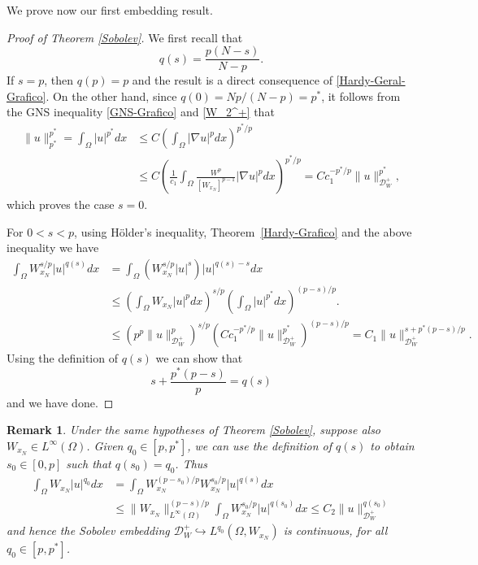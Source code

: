 \documentclass[12pt]{amsart}
\newtheorem{remark}[theorem]{Remark}
\theoremstyle{definition}
\theoremstyle{plain}
\newcommand{\dint}{\int_{\Omega}}
\begin{document}
We prove now our first embedding result.
\begin{proof}[Proof of Theorem \ref{Sobolev}]
We first recall that
$$q(s)=\frac{p(N-s)}{N-p}.
$$
If $s=p$, then $q(p)=p$ and the result is a direct consequence of \eqref{Hardy-Geral-Grafico}. On the other hand, since $q(0)=Np/(N-p)=p^*$,  
it follows from the GNS inequality \eqref{GNS-Grafico} and \eqref{W_2^+} that
 \begin{align*}
     \|u\|_{p^*}^{p^*} = \dint  |u|^{p^*}dx
			& \leq C\left(\dint  |\nabla u|^pdx\right)^{{p^*}/{p}} \\
            & \leq C \left( \frac{1}{c_1} \dint \frac{W^p}{[W_{x_N}]^{p-1}} 
            |\nabla u|^p dx \right)^{p^*/p} = 
            C c_1^{-p^*/p} 
            \|u\|_{\mathcal{D}_W^+}^{p^*},
 \end{align*}
 which proves the case $s=0$. 

For $0<s<p$, using H\"older's inequality, Theorem~\ref{Hardy-Grafico} and the 
above inequality  we have 
\begin{align*}
\int_\Omega W_{x_N}^{s/p}|u|^{q(s)}dx&=\int_\Omega (W_{x_N}^{s/p}|u|^s)|u|^{q(s)-s}dx\\
&\leq\left(\int_\Omega W_{x_N}|u|^pdx\right)^{s/p}\left(\int_\Omega|u|^{p^*}dx
\right)^{(p-s)/p}. \\
& \leq \left( p^p \|u\|_{\mathcal{D}_W^+}^p\right)^{s/p}  \left( 
Cc_1^{-p^*/p}\|u\|_{\mathcal{D}_W^+}^{p^*}\right)^{(p-s)/p}  = 
C_1 \|u\|_{\mathcal{D}_W^+}^{s + p^*(p-s)/p}.
\end{align*}
Using the definition of $q(s)$ we can show that
$$
s + \frac{p^*(p-s)}{p} = q(s)
$$
and we have done.
\end{proof}

\begin{remark}\label{Remark-General}Under the same hypotheses of Theorem \ref{Sobolev}, 
suppose also $W_{x_N} \in L^\infty({\Omega})$. Given $q_0 \in [p,p^*]$, we can use 
the definition of $q(s)$ 
to obtain $s_0 \in [0,p]$ such that $q(s_0)=q_0$. Thus
\begin{align*}
\int_\Omega W_{x_N}|u|^{q_0} dx &= \int_\Omega W_{x_N}^{(p-s_0)/p}W_{x_N}^{s_0/p}|u|^{q(s)} dx  
\\& \leq \|W_{x_N}\|_{L^{\infty}(\Omega)}^{(p-s)/p} \int_\Omega W_{x_N}^{s_0/p}|u|^{q(s_0)} dx 
\leq C_2 \|u\|_{\mathcal{D}_W^{+}}^{q(s_0)}
\end{align*}
and hence the Sobolev embedding $\mathcal{D}_W^+ \hookrightarrow L^{q_0}(\Omega,W_{x_N})$ is 
continuous, for all $q_0\in[p,p^*]$.
\end{remark}
\end{document}
